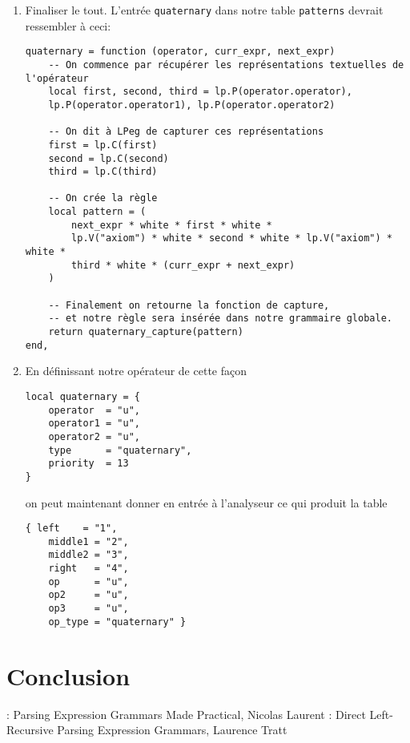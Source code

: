 \documentclass{article}
\begin{document}
\begin{enumerate}
	\begin{verbatim}
-- p est la règle
function quaternary_capture (p)
	-- On utilise l'opérateur de capture de LPeg
	return p / function (left, op1, middle1, op2, middle2, op3, right)
		-- Et on retourne juste une table.
		-- A savoir: on pourrait utiliser la fonction lpeg.Ct (Capture table),
		-- cependant il est préférable de définir nos clés nous-même, car lpeg.Ct
		-- retourne une table dont les clés sont des nombres (1, 2, ...)
		return {
			left    = left,
			op      = op1,
			op2     = op2,
			op3     = op3,
			middle1 = middle1,
			middle2 = middle2,
			right   = right,
			op_type = "quaternary"
		}
	end
end
	\end{verbatim}
	\item Finaliser le tout. L'entrée \lstinline|quaternary| dans notre table \lstinline|patterns| devrait ressembler à ceci:
	\begin{verbatim}
quaternary = function (operator, curr_expr, next_expr)
	-- On commence par récupérer les représentations textuelles de l'opérateur
	local first, second, third = lp.P(operator.operator), 
	lp.P(operator.operator1), lp.P(operator.operator2)
	
	-- On dit à LPeg de capturer ces représentations
	first = lp.C(first)
	second = lp.C(second)
	third = lp.C(third)
	
	-- On crée la règle
	local pattern = (
		next_expr * white * first * white *
		lp.V("axiom") * white * second * white * lp.V("axiom") * white *
		third * white * (curr_expr + next_expr)
	)
	
	-- Finalement on retourne la fonction de capture, 
	-- et notre règle sera insérée dans notre grammaire globale.
	return quaternary_capture(pattern)
end,
	\end{verbatim}
	\item En définissant notre opérateur de cette façon
	\begin{verbatim}
local quaternary = {
	operator  = "u",
	operator1 = "u",
	operator2 = "u",
	type      = "quaternary",
	priority  = 13
}
	\end{verbatim}
	on peut maintenant donner  en entrée à l'analyseur ce qui produit la table
	\begin{verbatim}
{ left    = "1",
	middle1 = "2",
	middle2 = "3",
	right   = "4",
	op      = "u",
	op2     = "u",
	op3     = "u", 
	op_type = "quaternary" }
	\end{verbatim}
\end{enumerate}
\section{Conclusion}

\newpage
\noindent[1]: Parsing Expression Grammars Made Practical, Nicolas Laurent \newline
[2]: Direct Left-Recursive Parsing Expression Grammars, Laurence Tratt
\end{document}
